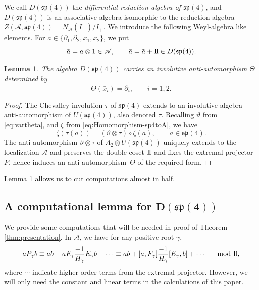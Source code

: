 \documentclass[10pt,a4paper]{amsart}
\numberwithin{equation}{section}
\newtheorem{Lemma}[Theorem]{Lemma}
\newcommand{\II}{\mathrm{I\hspace{-.1em}I}}
\begin{document}
We call $D(\mathfrak{sp}(4))$ the \emph{differential reduction algebra of $\mathfrak{sp}(4)$}, and $D(\mathfrak{sp}(4))$ is an associative algebra isomorphic to the
reduction algebra $Z(\mathscr{A},\mathfrak{sp}(4))=N_{\mathscr{A}}(I_+)/I_+$.
We introduce the following Weyl-algebra like elements.
For $a\in\{\partial_1,\partial_2,x_1,x_2\}$, we put
\[%
	\tilde a=a\otimes 1\in \mathscr{A}, \qquad \bar a=\tilde a+ \II \in D(\mathfrak{sp}(4)).
\]

\begin{Lemma}\label{lem:Dsp4-anti-automorphism}
	The algebra $D(\mathfrak{sp}(4))$ carries an involutive anti-automorphism $\Theta$ determined by
	\[
		\Theta(\bar x_i) = \bar \partial_i,\qquad i=1,2.
	\]
\end{Lemma}

\begin{proof}
	The Chevalley involution $\tau$ of $\mathfrak{sp}(4)$ extends to an involutive algebra anti-automorphism of $U(\mathfrak{sp}(4))$, also denoted $\tau$. Recalling $\vartheta$ from \eqref{eq:vartheta}, and $\zeta$ from \eqref{eq:Homomorphism-sp4toA},
	we have
	\[
		\zeta(\tau(a)) = (\vartheta\otimes \tau)\circ \zeta(a),\qquad a\in\mathfrak{sp}(4).
	\]
	The anti-automorphism $\vartheta\otimes\tau$ of $A_2\otimes U(\mathfrak{sp}(4))$ uniquely extends to the localization $\mathscr{A}$ and preserves the double coset $\II$ and fixes the extremal projector $P$, hence induces an anti-automor\-phism~$\Theta$ of the required form.
\end{proof}

Lemma \ref{lem:Dsp4-anti-automorphism} allows us to cut computations almost in half.

\subsection[A computational lemma for D(sp(4))]{A computational lemma for $\boldsymbol{D(\mathfrak{sp}(4))}$}\label{subsec:ComputationalLemma}
We provide some computations that will be needed in proof of Theorem \ref{thm:presentation}.
In $\mathscr{A}$, we have for any positive root $\gamma$,
\begin{gather}\label{eq:P_gamma}
	aP_\gamma b \equiv
	ab+aF_\gamma\frac{-1}{H_\gamma}E_{\gamma}b + \cdots
	\equiv ab+[a,F_\gamma]\frac{-1}{H_\gamma}[E_{\gamma},b] + \cdots\quad \mod{\II},
\end{gather}
where $\cdots$ indicate higher-order terms from the extremal projector. However, we will only need the constant and linear terms in the calculations of this paper.
\end{document}
